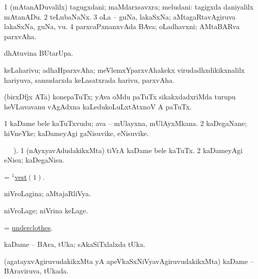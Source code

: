 \bentry
{} 
\gl{\nA}
\expl{}
\bmng
\bnum
\num{1} (mAtanADuvalilx) tagugxdani; maMdarxsavxra; meludani:  tagigxda daniyalilx mAtanADu. 
\num{2} teLubaNaNx. 
\num{3} oLa -- guNa, lakaSxNa; aMtagaRtavAgiruva lakaSxNa, guNa, \mo vu. 
\num{4} parxcaPxnanxvAda BAva; oLadhavxni; AMtaBARva parxvAha. 
\enum
\emng
\eentry

\bentry
{} 
\gl{\sakirx}
\expl{}
\bmng
  dhAtuvina BUtarUpa. 
\emng
\eentry

\bentry
{} 
\gl{\nA}
\expl{}
\bmng
 keLaharivu; adhaHparxvAha; meVlemxYparxvAhakekx virudadhxdikikxnalilx hariyuva, samudarxda keLasatxrada harivu, parxvAha. 
\emng
\eentry

\bentry
{} 
\gl{\nA}
\expl{}
\bmng
 (birxDfjx ATa) konepaTuTx; yAva oMdu paTuTx sikakxdadxriMda turupu heVLuvavanu vAgAdxna kaLedukoLuLxtAtxnoV A paTuTx. 
\emng
\eentry

\bentry
{} 
\gl{\nA}
\expl{}
\bmng
\bnum
\num{1} kaDame bele kaTuTxvudu; ava -- mUlayxna, mUlAyxMkana. 
\num{2} kaDegaNane; hiVneYke; kaDameyAgi gaNisuvike, eNisuvike. 
\enum
\emng
\eentry

\bentry
{} 
\gl{\sakirx}
\BUkaq\  \vakaq\ ). \bmng
\bnum
\num{1} (nAyxyavAdudakikxMta) tiVrA kaDame bele kaTuTx. 
\num{2} kaDameyAgi eNisu; kaDegaNisu. 
\enum
\emng
\eentry

\bentry
{} 
\gl{\nA}
\expl{}
\bmng
 = \hyperref{kandict_v.pdf}{V}{vest(1)1}{$^1$vest\((1)\)}. 
\emng
\eentry

\bentry
{} 
\gl{\gu}
\expl{}
\bmng
 niVroLagina; aMtajaRliVya. 
\emng
\eentry

\bentry
{} 
\gl{\kirxvi}
\expl{}
\bmng
 niVroLage; niVrina keLage. 
\emng
\eentry

\bentry
{} 
\gl{\nA}
\expl{}
\bmng
 = \hyperlink{underclothes}{underclothes}. 
\emng
\eentry

\bentry
{} 
\gl{\nA}
\expl{}
\bmng
 kaDame -- BAra, tUka; sAkaSiTxlalxda tUka. 
\emng
\eentry

\bentry
{} 
\gl{\gu}
\expl{}
\bmng
 (agatayxvAgiruvudakikxMta yA apeVkaSxNiVyavAgiruvudakikxMta) kaDame -- BAraviruva, tUkada. 
\emng
\eentry

